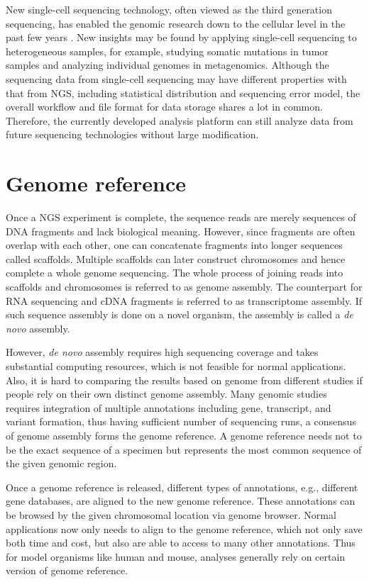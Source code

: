 New single-cell sequencing technology, often viewed as the third generation
sequencing, has enabled the genomic research down to the cellular level in the
past few years \cite{gawad2016:singlecell}. New insights may be found by
applying single-cell sequencing to heterogeneous samples, for example, studying
somatic mutations in tumor samples and analyzing individual genomes in
metagenomics. Although the sequencing data from single-cell sequencing may have
different properties with that from NGS, including statistical distribution and
sequencing error model, the overall workflow and file format for data storage
shares a lot in common. Therefore, the currently developed analysis platform
can still analyze data from future sequencing technologies without large
modification.



\section{Genome reference}
\label{s:genome-ref}

Once a NGS experiment is complete, the sequence reads are merely sequences of
DNA fragments and lack biological meaning. However, since fragments are often
overlap with each other, one can concatenate fragments into longer sequences
called scaffolds. Multiple scaffolds can later construct chromosomes and hence
complete a whole genome sequencing. The whole process of joining reads into
scaffolds and chromosomes is referred to as genome assembly. The counterpart
for RNA sequencing and cDNA fragments is referred to as transcriptome assembly.
If such sequence assembly is done on a novel organism, the assembly is called
a \textit{de novo} assembly.

However, \textit{de novo} assembly requires high sequencing coverage and takes
substantial computing resources, which is not feasible for normal applications.
Also, it is hard to comparing the results based on genome from different
studies if people rely on their own distinct genome assembly. Many genomic
studies requires integration of multiple annotations including gene, transcript,
and variant formation, thus having sufficient number of sequencing runs, a
consensus of genome assembly forms the genome reference. A genome reference
needs not to be the exact sequence of a specimen but represents the most common
sequence of the given genomic region.

Once a genome reference is released, different types of annotations, e.g.,
different gene databases, are aligned to the new genome reference. These
annotations can be browsed by the given chromosomal location via genome
browser. Normal applications now only needs to align to the genome reference,
which not only save both time and cost, but also are able to access to many
other annotations. Thus for model organisms like human and mouse, analyses
generally rely on certain version of genome reference.

